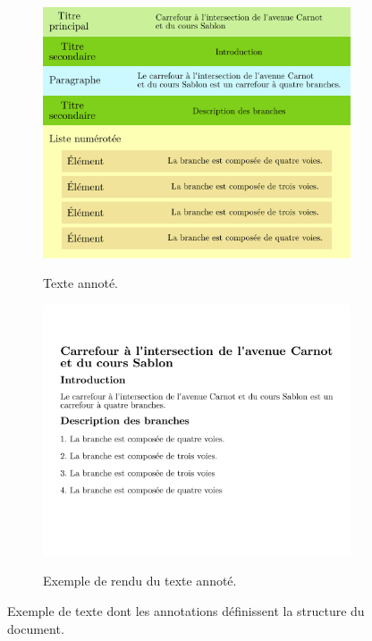\begin{figure}[ht]
    \centering
    \begin{subfigure}{0.49\textwidth}
        \includegraphics[width=\textwidth]{images/description/exemple_texte_augmente_1.pdf}
        \label{fig:desc_ex_texte_annoté_1}
        \caption{Texte annoté.}
    \end{subfigure}
    \begin{subfigure}{0.49\textwidth}
        \includegraphics[width=\textwidth]{images/description/exemple_texte_augmente_2.pdf}
        \label{fig:desc_ex_texte_annoté_2}
        \caption{Exemple de rendu du texte annoté.}
    \end{subfigure}
    \caption[Exemple de texte annoté.]{Exemple de texte dont les annotations définissent la structure du document.}
    \label{fig:desc_ex_texte_annoté}
\end{figure}

